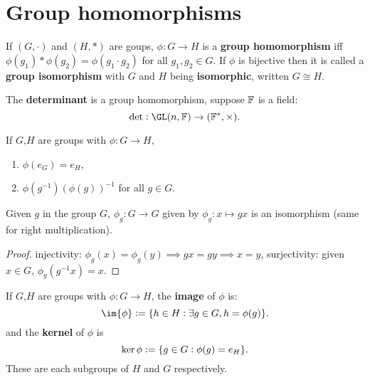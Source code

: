 \documentclass[../Year1/Year1.tex]{subfiles}
\begin{document}
\section{Group homomorphisms}

\begin{definition}
    If $(G,\cdot)$ and $(H,\ast)$ are goups, $\phi:G\rightarrow H$ is a \textbf{group homomorphism} iff $\phi(g_1)\ast\phi(g_2) = \phi(g_1\cdot g_2)$ for all $g_1,g_2\in G$. If $\phi$ is bijective then it is called a \textbf{group isomorphism} with $G$ and $H$ being \textbf{isomorphic}, written $G\cong H$.
\end{definition}

\begin{example}[determinant]
    The \textbf{determinant} is a group homomorphism, suppose $\mathbb{F}$ is a field:\[
    \det: \GL(n,\FF)\rightarrow(\FF^*,\times)
    \textcolor{black}{.}
    \]
\end{example}

\vspace{-30pt}

\begin{lemma}
    If $G$,$H$ are groups with $\phi:G\rightarrow H$, \begin{enumerate}
        \item $\phi(e_G) = e_H$,
        \item $\phi(g^{-1}) {(\phi(g))}^{-1}$ for all $g\in G$.
    \end{enumerate}
\end{lemma}

\begin{lemma}\label{bijection from element}
    Given $g$ in the group $G$, $\phi_g:G\rightarrow G$ given by $\phi_g:x\mapsto gx$ is an isomorphism (same for right multiplication).
\end{lemma}

\begin{proof}
    injectivity: $\phi_g(x)=\phi_g(y)\implies gx=gy \implies x=y$, \qquad surjectivity: given $x\in G$, $\phi_g(g^{-1}x)=x$.
\end{proof}

\begin{definition}
    If $G$,$H$ are groups with $\phi:G\rightarrow H$, the \textbf{image} of $\phi$ is: \[
        \im{\phi} := \{h\in H:\exists g\in G, h = \phi(g)\}
    \textcolor{black}{.}
    \] and the \textbf{kernel} of $\phi$ is \[
        \ker{\phi} := \{g\in G: \phi(g)=e_H\}
    \textcolor{black}{.}
    \]
    These are each subgroups of $H$ and $G$ respectively.
\end{definition}
\end{document}
